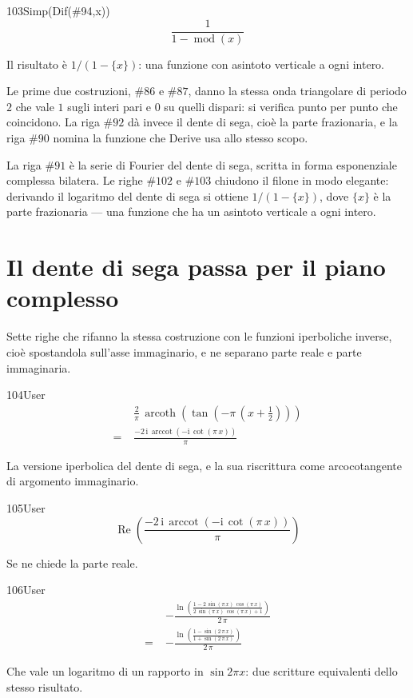 \begin{espr}{103}{Simp(Dif(\#94,x))}{}
\[
\frac{1}{1 - \operatorname{mod}\!\left(x\right)}
\]
\end{espr}
Il risultato è $1/(1-\{x\})$: una funzione con asintoto verticale a ogni intero.


Le prime due costruzioni, $\#86$ e $\#87$, danno la stessa onda triangolare di periodo $2$ che vale $1$ sugli interi pari e $0$ su quelli dispari: si verifica punto per punto che coincidono. La riga $\#92$ dà invece il dente di sega, cioè la parte frazionaria, e la riga $\#90$ nomina la funzione che Derive usa allo stesso scopo.

La riga $\#91$ è la serie di Fourier del dente di sega, scritta in forma esponenziale complessa bilatera. Le righe $\#102$ e $\#103$ chiudono il filone in modo elegante: derivando il logaritmo del dente di sega si ottiene $1/(1-\{x\})$, dove $\{x\}$ è la parte frazionaria — una funzione che ha un asintoto verticale a ogni intero.

\section{Il dente di sega passa per il piano complesso}

Sette righe che rifanno la stessa costruzione con le funzioni iperboliche inverse, cioè spostandola sull'asse immaginario, e ne separano parte reale e parte immaginaria.

\begin{espr}{104}{User}{\verificata}
\begin{align*}
& \frac{2}{\pi}\, \operatorname{arcoth}\!\left(\tan\!\left(-\pi\, \left(x + \frac{1}{2}\right)\right)\right) \\
=\;& \frac{-2\, \mathrm{i}\, \operatorname{arccot}\!\left(-\mathrm{i}\, \cot\!\left(\pi\, x\right)\right)}{\pi}
\end{align*}
\end{espr}
La versione iperbolica del dente di sega, e la sua riscrittura come arcocotangente di argomento immaginario.

\begin{espr}{105}{User}{}
\[
\operatorname{Re}\!\left(\frac{-2\, \mathrm{i}\, \operatorname{arccot}\!\left(-\mathrm{i}\, \cot\!\left(\pi\, x\right)\right)}{\pi}\right)
\]
\end{espr}
Se ne chiede la parte reale.

\begin{espr}{106}{User}{\verificata}
\begin{align*}
& -\frac{\ln\!\left(\frac{1 - 2\, \sin\!\left(\pi\, x\right)\, \cos\!\left(\pi\, x\right)}{2\, \sin\!\left(\pi\, x\right)\, \cos\!\left(\pi\, x\right) + 1}\right)}{2\, \pi} \\
=\;& -\frac{\ln\!\left(\frac{1 - \sin\!\left(2\, \pi\, x\right)}{1 + \sin\!\left(2\, \pi\, x\right)}\right)}{2\, \pi}
\end{align*}
\end{espr}
Che vale un logaritmo di un rapporto in $\sin2\pi x$: due scritture equivalenti dello stesso risultato.

